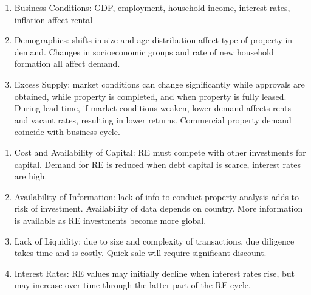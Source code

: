 \begin{remark} 
\begin{enumerate}[label=\roman*.]
\setlength{\itemsep}{0pt}
\item Business Conditions: GDP, employment, household income, interest rates, inflation affect rental
\item Demographics: shifts in size and age distribution affect type of property in demand. Changes in socioeconomic groups and rate of new household formation all affect demand.
\item Excess Supply: market conditions can change significantly while approvals are obtained, while property is completed, and when property is fully leased.\\
During lead time, if market conditions weaken, lower demand affects rents and vacant rates, resulting in lower returns. Commercial property demand coincide with business cycle.
\end{enumerate}
\end{remark}

\begin{remark} 
\begin{enumerate}[label=\roman*.]
\setlength{\itemsep}{0pt}
\item Cost and Availability of Capital: RE must compete with other investments for capital. Demand for RE is reduced when debt capital is scarce, interest rates are high.
\item Availability of Information: lack of info to conduct property analysis adds to risk of investment. Availability of data depends on country. More information is available as RE investments become more global.
\item Lack of Liquidity: due to size and complexity of transactions, due diligence takes time and is costly. Quick sale will require significant discount.
\item Interest Rates: RE values may initially decline when interest rates rise, but may increase over time through the latter part of the RE cycle.
\end{enumerate}
\end{remark}

